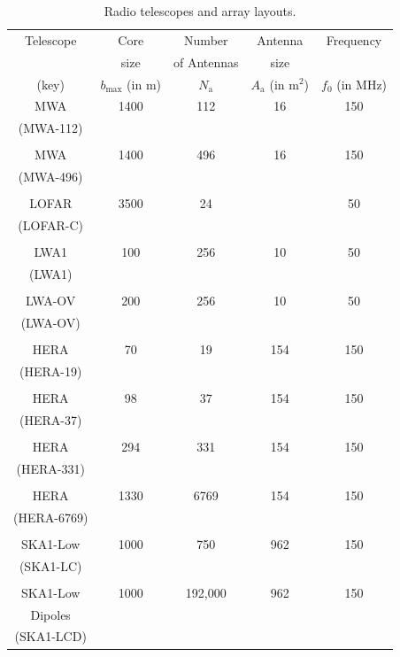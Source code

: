 \documentclass[a4paper,fleqn,usenatbib]{../mnras}
\begin{document}
\begin{table}
  \centering
  \caption{Radio telescopes and array layouts.}
  \label{tab:antenna-layouts}
  \begin{threeparttable}
  \begin{tabular}{ccccc} 
    \hline
    Telescope & Core & Number & Antenna & Frequency \\
              & size & of Antennas & size & \\
    (key)     & $b_\textrm{max}$ (in m) & $N_\textrm{a}$ & $A_\textrm{a}$ (in m$^2$) & $f_0$ (in MHz) \\
    \hline
    MWA & 1400 & 112 & 16 & 150 \\
    (MWA-112) \\ \\
    MWA & 1400 & 496 & 16 & 150 \\
    (MWA-496) \\ \\
    LOFAR & 3500 & 24 & & 50 \\
    (LOFAR-C) & & & & \\ \\
    LWA1 & 100 & 256 & 10 & 50 \\
    (LWA1) \\ \\
    LWA-OV\tnote{a} & 200 & 256 & 10 & 50 \\
    (LWA-OV) & & & & \\ \\
    HERA & 70 & 19 & 154 & 150 \\
    (HERA-19) \\ \\
    HERA & 98 & 37 & 154 & 150 \\
    (HERA-37) \\ \\
    HERA & 294 & 331 & 154 & 150 \\
    (HERA-331) \\ \\
    HERA & 1330 & 6769\tnote{b} & 154 & 150 \\
    (HERA-6769) \\ \\
    SKA1-Low & 1000 & 750\tnote{c} & 962 & 150 \\
    (SKA1-LC) \\ \\
    SKA1-Low & 1000 & 192,000\tnote{c} & 962 & 150 \\
    Dipoles\tnote{d} \\
    (SKA1-LCD) \\

\end{tabular}
\end{threeparttable}
\end{table}
\end{document}
